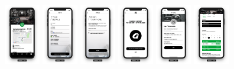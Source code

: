 \begin{figure}[H]
    \includegraphics[width=0.14\textwidth]{pfc/figuras/gym-profile.png}
    \includegraphics[width=0.14\textwidth]{pfc/figuras/register-trainer.png}
    \includegraphics[width=0.14\textwidth]{pfc/figuras/register-trainer-verification.png}
    \includegraphics[width=0.14\textwidth]{pfc/figuras/tr-congratulations.png}
    \includegraphics[width=0.14\textwidth]{pfc/figuras/tr-register-profile-1.png}
    \includegraphics[width=0.14\textwidth]{pfc/figuras/tr-gym-profile-2.png}

\end{figure}
